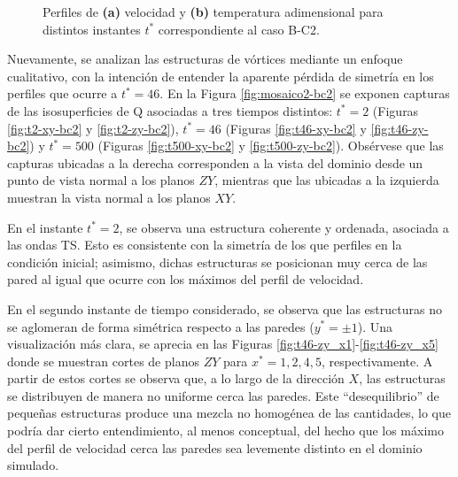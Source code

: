 \begin{figure}[H]
  \centering  
  
  \caption{Perfiles de \textbf{(a)} velocidad y \textbf{(b)} temperatura adimensional para distintos instantes $t^*$ correspondiente al caso B-C2.}
    \label{fig:mosaico-bc2}
\end{figure}


Nuevamente, se analizan las estructuras de vórtices mediante un enfoque cualitativo, con la intención de entender la aparente pérdida de simetría en los perfiles que ocurre a $t^* = 46$. En la Figura \ref{fig:mosaico2-bc2} se exponen capturas de las isosuperficies de Q asociadas a tres tiempos distintos: $t^* = 2$ (Figuras \ref{fig:t2-xy-bc2} y  \ref{fig:t2-zy-bc2}),  $t^* = 46$  (Figuras \ref{fig:t46-xy-bc2} y \ref{fig:t46-zy-bc2}) y  $t^* = 500$  (Figuras \ref{fig:t500-xy-bc2} y \ref{fig:t500-zy-bc2}). Obsérvese que las capturas ubicadas a la derecha corresponden a la vista del dominio desde un punto de vista normal a los planos $ZY$, mientras que las ubicadas a la izquierda muestran la vista normal a los planos $XY$.

En el instante $t^* = 2$, se observa una estructura coherente y ordenada, asociada a las ondas TS. Esto es consistente con la simetría de los que perfiles en la condición inicial; asimismo, dichas estructuras se posicionan muy cerca de las pared al igual que ocurre con los máximos del perfil de velocidad.

En el segundo instante de tiempo considerado, se observa que las estructuras no se aglomeran de forma simétrica respecto a las paredes ($y^*=\pm 1$). Una visualización más clara, se aprecia en las Figuras \ref{fig:t46-zy_x1}-\ref{fig:t46-zy_x5} donde se muestran cortes de planos $ZY$ para $x^*=1,2,4,5$, respectivamente. A partir de estos cortes se observa que, a lo largo de la dirección $X$, las estructuras se distribuyen de manera no uniforme cerca las paredes. Este ``desequilibrio'' de pequeñas estructuras produce una mezcla no homogénea de las cantidades, lo que podría dar cierto entendimiento, al menos conceptual, del hecho que los máximo del perfil de velocidad cerca las paredes sea levemente distinto en el dominio simulado.   

